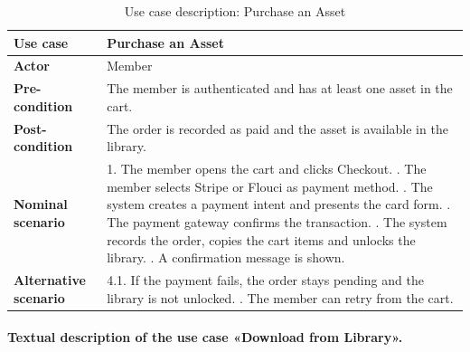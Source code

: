 \begin{table}[H]
\centering
\caption{Use case description: Purchase an Asset}
\label{tab:uc_purchase}
\renewcommand{\arraystretch}{1.3}
\begin{tabularx}{\textwidth}{|L{3.2cm}|X|}
\hline
\textbf{Use case} & Purchase an Asset \\
\hline
\textbf{Actor} & Member \\
\hline
\textbf{Pre-condition} & The member is authenticated and has at least one asset in the cart. \\
\hline
\textbf{Post-condition} & The order is recorded as paid and the asset is available in the library. \\
\hline
\textbf{Nominal scenario} &
1. The member opens the cart and clicks Checkout. . The member selects Stripe or Flouci as payment method. . The system creates a payment intent and presents the card form. . The payment gateway confirms the transaction. . The system records the order, copies the cart items and unlocks the library. . A confirmation message is shown. \\
\hline
\textbf{Alternative scenario} &
4.1. If the payment fails, the order stays pending and the library is not unlocked. . The member can retry from the cart. \\
\hline
\end{tabularx}
\end{table}

\paragraph{Textual description of the use case «Download from Library».}

